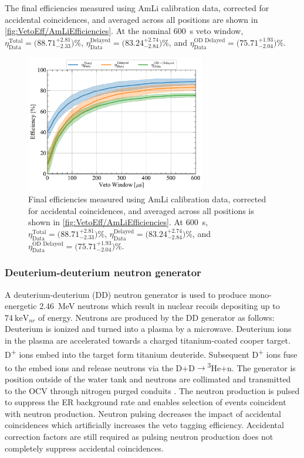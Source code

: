The final efficiencies measured using AmLi calibration data, corrected for accidental coincidences, and averaged across all positions are shown in \autoref{fig:VetoEff/AmLiEfficiencies}. At the nominal 600~\textmu s veto window, $\eta^\text{Total}_\text{Data}=\big(88.71^{+2.81}_{-2.33}\big)\%$, $\eta^\text{Delayed}_\text{Data}=\big(83.24^{+2.74}_{-2.84}\big)\%$, and $\eta^\text{OD Delayed}_\text{Data}=\big(75.71^{+1.93}_{-2.04}\big)\%$.

\begin{figure}[!ht]
    \centering
    \includegraphics[width=0.7\textwidth]{figures/VetoEfficiency/AmLiEfficiencies_Data.pdf}
    \caption{Final efficiencies measured using AmLi calibration data, corrected for accidental coincidences, and averaged across all positions is shown in \autoref{fig:VetoEff/AmLiEfficiencies}. At 600~\textmu s, $\eta^\text{Total}_\text{Data}=\big(88.71^{+2.81}_{-2.33}\big)\%$, $\eta^\text{Delayed}_\text{Data}=\big(83.24^{+2.74}_{-2.84}\big)\%$, and $\eta^\text{OD Delayed}_\text{Data}=\big(75.71^{+1.93}_{-2.04}\big)\%$.}
    \label{fig:VetoEff/AmLiEfficiencies}
\end{figure}

\subsubsection{Deuterium-deuterium neutron generator}
A deuterium-deuterium (DD) neutron generator is used to produce mono-energetic 2.46~MeV neutrons which result in nuclear recoils depositing up to $74~\text{keV}_{nr}$ of energy. Neutrons are produced by the DD generator as follows: Deuterium is ionized and turned into a plasma by a microwave. Deuterium ions in the plasma are accelerated towards a charged titanium-coated cooper target. D\textsuperscript{+} ions embed into the target form titanium deuteride. Subsequent D\textsuperscript{+} ions fuse to the embed ions and release neutrons via the D+D$\rightarrow$\textsuperscript{3}He+n. The generator is position outside of the water tank and neutrons are collimated and transmitted to the OCV through nitrogen purged conduits \cite{LZ:2024bsz}. The neutron production is pulsed to suppress the ER background rate and enables selection of events coincident with neutron production. Neutron pulsing decreases the impact of accidental coincidences which artificially increases the veto tagging efficiency. Accidental correction factors are still required as pulsing neutron production does not completely suppress accidental coincidences.

